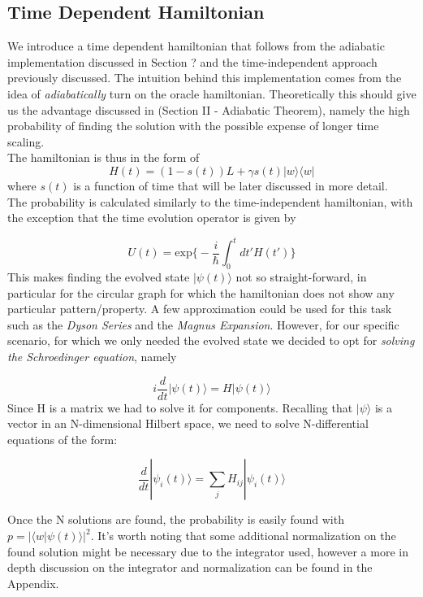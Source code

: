 \documentclass[aps,pra,reprint, onecolumn, showkeys]{revtex4-2}
\begin{document}
\subsection{Time Dependent Hamiltonian}
We introduce a time dependent hamiltonian that follows from the adiabatic implementation discussed in Section ? and the time-independent approach previously discussed. The intuition behind this implementation comes from the idea of \textit{adiabatically} turn on the oracle hamiltonian. Theoretically this should give us the advantage discussed in (Section II - Adiabatic Theorem), namely the high probability of finding the solution with the possible expense of longer time scaling. \\
The hamiltonian is thus in the form of
\begin{equation}
H(t) = (1-s(t))L + \gamma s(t)|w\rangle\langle w|
\end{equation}
where $s(t)$ is a function of time that will be later discussed in more detail. \\

The probability is calculated similarly to the time-independent hamiltonian, with the exception that the time evolution operator is given by

\begin{equation}
U(t) = \mbox{exp} \Big\{ -\frac{i}{\hbar} \int_{0}^{t}dt'H(t') \Big\}
\end{equation}
This makes finding the evolved state $|\psi(t)\rangle$ not so straight-forward, in particular for the circular graph for which the hamiltonian does not show any particular pattern/property. A few approximation could be used for this task such as the \textit{Dyson Series} and the \textit{Magnus Expansion}. However, for our specific scenario, for which we only needed the evolved state we decided to opt for \textit{solving the Schroedinger equation}, namely

\begin{equation}
  i\frac{d}{dt}|\psi(t)\rangle = H |\psi(t)\rangle
\end{equation}
Since H is a matrix we had to solve it for components. Recalling that $|\psi\rangle$ is a vector in an N-dimensional Hilbert space, we need to solve N-differential equations of the form:

\begin{equation}
\frac{d}{dt}|\psi_i(t)\rangle = \sum_jH_{ij}|\psi_i(t)\rangle
\end{equation}

Once the N solutions are found, the probability is easily found with $p=|\langle w |\psi(t)\rangle|^2$. It's worth noting that some additional normalization on the found solution might be necessary due to the integrator used, however a more in depth discussion on the integrator and normalization can be found in the Appendix.
\end{document}
